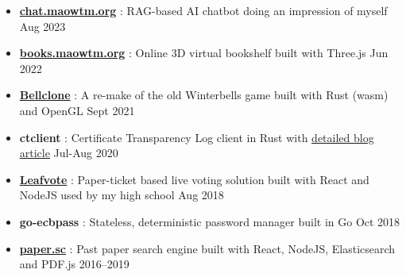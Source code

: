   \begin{itemize}
    \item \href{https://chat.maowtm.org}{\textbf{\color{link}chat.maowtm.org}} : RAG-based AI chatbot doing an impression of myself \dashdiv{} Aug 2023


    \item \href{https://books.maowtm.org}{\textbf{\color{link}books.maowtm.org}} : Online 3D virtual bookshelf built with Three.js \dashdiv{} Jun 2022

    \item \href{https://bellclone.maowtm.org/}{\color{link}\textbf{Bellclone}} : A re-make of the old Winterbells game built with Rust (wasm) and OpenGL \dashdiv{} Sept 2021

    \item \textbf{ctclient} : Certificate Transparency Log client in Rust with \href{https://blog.maowtm.org/ct/en.html}{\color{link}detailed blog article} \dashdiv{} Jul-Aug 2020

    \item \href{https://leafvote.mww.moe}{\color{link}\textbf{Leafvote}} : Paper-ticket based live voting solution built with React and NodeJS used by my high school \dashdiv{} Aug 2018


    \item \textbf{go-ecbpass} : Stateless, deterministic password manager built in Go \dashdiv{} Oct 2018

    \item \href{https://paper.sc}{\color{link}\textbf{paper.sc}} : Past paper search engine built with React, NodeJS, Elasticsearch and PDF.js \dashdiv{} 2016--2019


\end{itemize}
